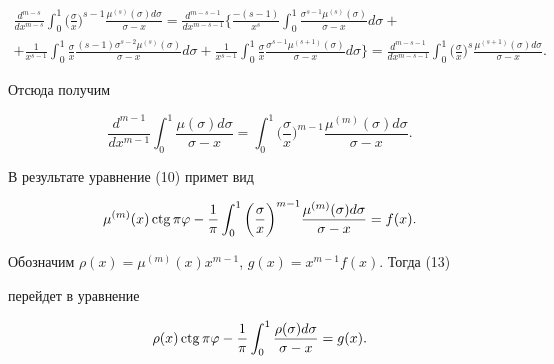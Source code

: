 \begin{gather*} 


\frac{d^{m-s}}{dx^{m-s}}\int^1_0\bigg(\frac{\sigma}{x} \bigg)^{s-1} 


\frac{\mu^{(s)}(\sigma)d\sigma}{\sigma-x}=\frac{d^{m-s-1}} {dx^{m-s-1}} 


\bigg\{\frac{-(s-1)}{x^s}\int^1_0 


\frac{\sigma^{s-1}\mu^{(s)}(\sigma)}{\sigma-x}d\sigma+ \\ 


% 


+\frac{1}{x^{s-1}}\int^1_0\frac{\sigma}{x} 


\frac{(s-1)\sigma^{s-2}\mu^{(s)}(\sigma)}{\sigma-x}d\sigma+ 


\frac{1}{x^{s-1}}\int^1_0\frac{\sigma}{x} 


\frac{\sigma^{s-1}\mu^{(s+1)}(\sigma)}{\sigma-x}d\sigma\bigg\}= 


\frac{d^{m-s-1}}{dx^{m-s-1}}\int^1_0\bigg(\frac{\sigma}{x} \bigg)^s 


\frac{\mu^{(s+1)}(\sigma)d\sigma}{\sigma-x}. 


\end{gather*} 


Отсюда получим 


$$ 


\frac{d^{m-1}}{dx^{m-1}}\int^1_0\frac{\mu(\sigma)d\sigma}{\sigma-x} 


=\int^1_0\bigg(\frac{\sigma}{x} \bigg)^{m-1} 


\frac{\mu^{(m)}(\sigma)d\sigma}{\sigma-x}. 


$$ 


В результате уравнение (10) примет вид 


\begin{equation} 


\mu^{(m)}(x)\ctg\pi\varphi-\frac{1}{\pi}\int^1_0 


\bigg(\frac{\sigma}{x} \bigg)^{m-1} 


\frac{\mu^{(m)}(\sigma)d\sigma}{\sigma-x}=f(x). 


\end{equation} 


 


Обозначим $\rho(x)=\mu^{(m)}(x)x^{m-1}$, $g(x)=x^{m-1}f(x)$. Тогда (13) 


перейдет в уравнение 


\begin{equation} 


\rho(x)\ctg\pi\varphi-\frac{1}{\pi}\int^1_0 


\frac{\rho(\sigma)d\sigma}{\sigma-x}=g(x). 


\end{equation} 


